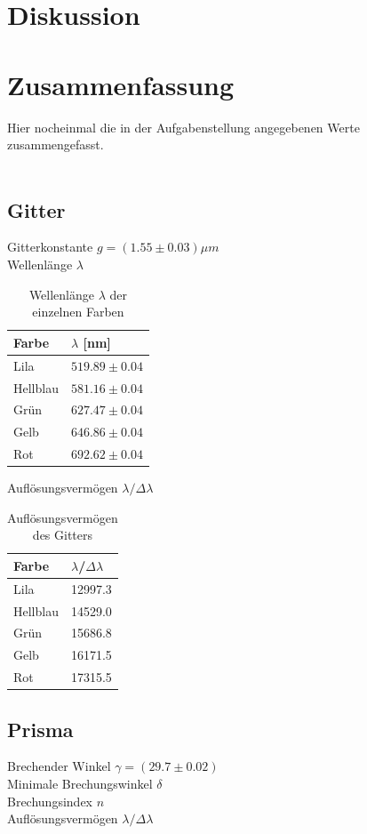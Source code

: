 \documentclass[12pt,a4paper,twoside]{article}
\begin{document}
\section{Diskussion} %


\section{Zusammenfassung} %
Hier nocheinmal die in der Aufgabenstellung angegebenen Werte zusammengefasst. 
\\
\\
\subsection{Gitter}
Gitterkonstante  $g = (1.55 \pm 0.03)\mu m$ \\
Wellenlänge $\lambda$

\begin{table}[H]
    \centering
    \caption{Wellenlänge $\lambda$ der einzelnen Farben}
    \label{tab:zus wellenlänge gitter}
    \begin{tabular}{| l | l |}
        \hline
        Farbe & $\lambda$ [nm] \\
        \hline
        Lila        & $ 519.89 \pm 0.04 $ \\
        Hellblau    & $ 581.16 \pm 0.04 $ \\
        Grün        & $ 627.47 \pm 0.04 $ \\
        Gelb        & $ 646.86 \pm 0.04 $ \\
        Rot         & $ 692.62 \pm 0.04 $ \\
        \hline
    \end{tabular}
\end{table}

\noindent
Auflösungsvermögen $\lambda / \Delta \lambda$

\begin{table}[H]
    \centering
    \caption{Auflösungsvermögen des Gitters}
    \label{tab:zus Auflösungsvermögen gitter}
    \begin{tabular}{| l | l |}
        \hline
        Farbe & $\lambda$/$\Delta \lambda$ \\
        \hline
        Lila        &  12997.3\\
        Hellblau    &  14529.0\\
        Grün        &  15686.8\\
        Gelb        &  16171.5\\
        Rot         &  17315.5\\
        \hline
    \end{tabular}
\end{table}

\subsection{Prisma}
Brechender Winkel $\gamma = (29.7 \pm 0.02)$ \\
Minimale Brechungswinkel $\delta$ \\
Brechungsindex $n$ \\
Auflösungsvermögen $\lambda / \Delta \lambda$

\printbibliography[heading=bibintoc]
\end{document}
